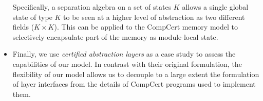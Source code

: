 \documentclass[acmsmall,screen,review,anonymous]{acmart}
\begin{document}
\begin{itemize}
  Specifically,
  a separation algebra on a set of states $K$
  allows a single global state of type $K$
  to be seen at a higher level of abstraction
  as two different fields ($K \times K$).
  This can be applied to the CompCert memory model
  to selectively encapsulate part of the memory
  as module-local state.
\item
  Finally,
  we use \emph{certified abstraction layers} \cite{popl15}
  as a case study to assess the capabilities of our model.
  In contrast with their original formulation,
  the flexibility of our model allows us
  to decouple to a large extent
  the formulation of layer interfaces
  from the details of CompCert programs
  used to implement them.
\end{itemize}


%
%
%
%
%
\end{document}
